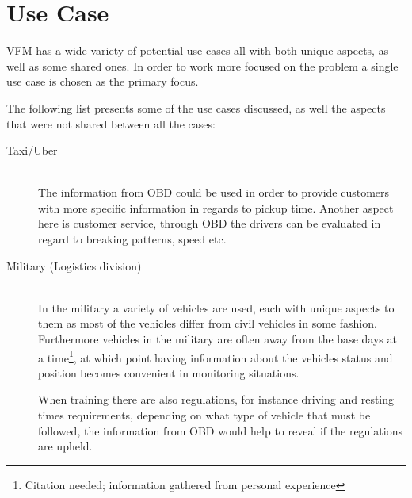 \section{Use Case}\label{sec:use_case}
\acl{VFM} has a wide variety of potential use cases all with both unique aspects, as well as some shared ones.
In order to work more focused on the problem a single use case is chosen as the primary focus.

The following list presents some of the use cases discussed, as well the aspects that were not shared between all the cases:

\begin{description}
    \item [Taxi/Uber] \hfill \\
    The information from \ac{OBD} could be used in order to provide customers with more specific information in regards to pickup time.
    Another aspect here is customer service, through \ac{OBD} the drivers can be evaluated in regard to breaking patterns, speed etc.
    \item [Military (Logistics division)] \hfill \\
    In the military a variety of vehicles are used, each with unique aspects to them as most of the vehicles differ from civil vehicles in some fashion.
    Furthermore vehicles in the military are often away from the base days at a time\footnote{Citation needed; information gathered from personal experience}, at which point having information about the vehicles status and position becomes convenient in monitoring situations.

    When training there are also regulations, for instance driving and resting times requirements, depending on what type of vehicle that must be followed, the information from \ac{OBD} would help to reveal if the regulations are upheld.


\end{description}
